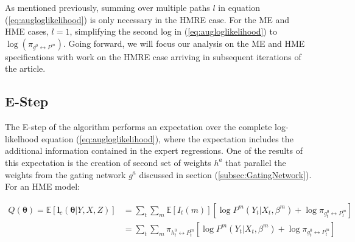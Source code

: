 \documentclass[12pt]{article}
\newcommand{\gateprod}[2]{\pi_{#1 \longleftrightarrow #2}}
\begin{document}
As mentioned previously, summing over multiple paths $l$ in equation
(\ref{eq:augloglikelihood}) is only necessary in the HMRE case. For the ME
and HME cases, $l = 1$, simplifying the second log in (\ref{eq:augloglikelihood})
to $\log(\gateprod{g^{0}}{P^{m}})$. Going forward, we will focus our analysis on
the ME and HME specifications with work on the HMRE case arriving in subsequent
iterations of the article.




\subsection{E-Step}
The E-step of the algorithm performs an expectation over the complete
log-likelhood equation (\ref{eq:augloglikelihood}), where the expectation
includes the additional information contained in the expert regressions.
One of the results of this expectation is the creation of second set of
weights $h^{a}$ that parallel the weights from the gating network $g^{a}$
discussed in section (\ref{subsec:GatingNetwork}). For an HME model:

\begin{equation} \label{eq:Estep}
  \begin{split}
  Q(\boldsymbol{\theta}) = \mathbb{E} \left [ \boldsymbol{l}_{c}(\boldsymbol{\theta}|Y,X,Z) \right] & = \sum_{t}\sum_{m} \mathbb{E} \left[ I_{t}(m) \right] \left[ \log P^{m}(Y_{t}|X_{t}, \beta^{m}) + \log \gateprod{g^{0}_{t}}{P^{m}_{t}} \right] \\ 
   & = \sum_{t} \sum_{m} \gateprod{h^{0}_{t}}{P^{m}_{t}} \left[ \log P^{m}(Y_{t}|X_{t},\beta^{m}) + \log \gateprod{g^{0}_{t}}{P^{m}_{t}} \right]
 \end{split}
\end{equation}
\end{document}
